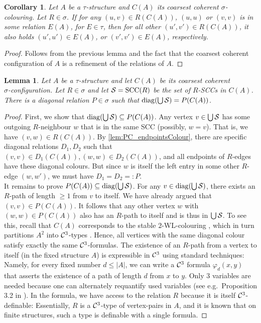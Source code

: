 \documentclass[10pt,a4paper]{article}
\newtheorem{lemma}[theorem]{Lemma}
\newtheorem{corollary}[theorem]{Corollary}
\renewcommand{\phi}{\varphi}
\renewcommand{\phi}{\varphi}
\newcommand{\WL}{\textrm {WL}}
\newcommand{\Cc}{{\cal C}}
\newcommand{\Ss}{{\cal S}}
\newcommand{\sccs}{{\operatorname{SCC}}}
\newcommand{\diag}{{\operatorname{diag}}}
\begin{document}
	
	\begin{corollary}
		\label{cor:PC_endpointsColour}
		Let $A$ be a $\tau$-structure and $C(A)$ its coarsest coherent $\sigma$-colouring. Let $R \in \sigma$. If for any $(u,v) \in R(C(A))$, $(u,u)$ or $(v,v)$ is in some relation $E(A)$, for $E \in \tau$, then for all other $(u',v') \in R(C(A))$, it also holds $(u',u') \in E(A)$, or $(v',v') \in E(A)$, respectively.
	\end{corollary}
	\begin{proof}
		Follows from the previous lemma and the fact that the coarsest coherent configuration of $A$ is a refinement of the relations of $A$.
	\end{proof}
	
	\begin{lemma}
		\label{lem:PC_SCCsSingleColoured}
		Let $A$ be a $\tau$-structure and let $C(A)$ be its coarsest coherent \\$\sigma$-configuration. Let $R \in \sigma$ and let $\Ss = \sccs(R)$ be the set of $R$-SCCs in $C(A)$. There is a diagonal relation $P \in \sigma$ such that $\diag(\bigcup \Ss) = P(C(A))$.
	\end{lemma}
	\begin{proof}
		First, we show that $\diag(\bigcup \Ss) \subseteq P(C(A))$.	
		Any vertex $v \in \bigcup \Ss$ has some outgoing $R$-neighbour $w$ that is in the same SCC (possibly, $w = v$). That is, we have $(v,w) \in R(C(A))$. By \autoref{lem:PC_endpointsColour}, there are specific diagonal relations $D_1, D_2$ such that $(v,v) \in D_1(C(A)), (w,w) \in D_2(C(A))$, and all endpoints of $R$-edges have these diagonal colours. But since $w$ is itself the left entry in some other $R$-edge $(w,w')$, we must have $D_1 = D_2 =: P$.\\
		It remains to prove $P(C(A)) \subseteq \diag(\bigcup \Ss)$. For any $v \in \diag(\bigcup \Ss)$, there exists an $R$-path of length $\geq 1$ from $v$ to itself. We have already argued that $(v,v) \in P(C(A))$. It follows that any other vertex $w$ with $(w,w) \in P(C(A))$ also has an $R$-path to itself and is thus in $\bigcup \Ss$. To see this, recall that $C(A)$ corresponds to the stable $2$-\WL -colouring \cite{dwl}, which in turn partitions $A^2$ into $\Cc^3$-types \cite{sandraSiglog}. Hence, all vertices with the same diagonal colour satisfy exactly the same $\Cc^3$-formulas. 
		The existence of an $R$-path from a vertex to itself (in the fixed structure $A$) is expressible in $\Cc^3$ using standard techniques: Namely, for every fixed number $d \leq |A|$, we can write a $\Cc^3$ formula $\phi_d(x,y)$ that asserts the existence of a path of length $d$ from $x$ to $y$. Only $3$ variables are needed because one can alternately requantify used variables (see e.g.\ Proposition 3.2 in \cite{immermanLander}). In the formula, we have access to the relation $R$ because it is itself $\Cc^3$-definable: Essentially, $R$ is a $\Cc^3$-type of vertex-pairs in $A$, and it is known that on finite structures, such a type is definable with a single formula.
	\end{proof} 
	
\end{document}
